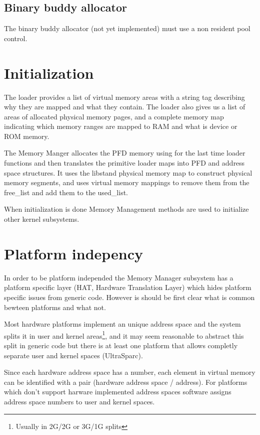 \subsection{Binary buddy allocator}

The binary buddy allocator (not yet implemented) must use a non resident pool control.

\section{Initialization}

The loader provides a list of virtual memory areas with a string tag
describing why they are mapped and what they contain. The loader also
gives us a list of areas of allocated physical memory pages,
 and a complete memory map indicating which memory ranges are mapped
to RAM and what is device or ROM memory.

The Memory Manger allocates the PFD memory using for the last time 
loader functions and then translates the primitive loader maps into
PFD and address space structures. It uses the libstand physical memory map
to construct physical memory segments,
and uses virtual memory mappings to remove them from the free\_list and add them
to the used\_list.

When initialization is done Memory Management methods are used to
initialize other kernel subsystems.

\section{Platform indepency}

In order to be platform independed the Memory Manager subsystem
has a platform specific layer (HAT, Hardware Translation Layer) which
hides platform specific issues from generic code.
 However is should be first clear what is common bewteen platforms and what
not.

Most hardware platforms implement an unique address space and the system splits 
it in user and kernel areas\footnote{Usually in 2G/2G or 3G/1G splits},
and it may seem reasonable to abstract this split in generic code but
there is at least one platform that allows completly separate user and kernel
spaces (UltraSparc). 

Since each hardware address space has a number, each element
in virtual memory can be identified with a pair (hardware address space / address).
 For platforms which don't support harware implemented address spaces software
assigns address space numbers to user and kernel spaces.

